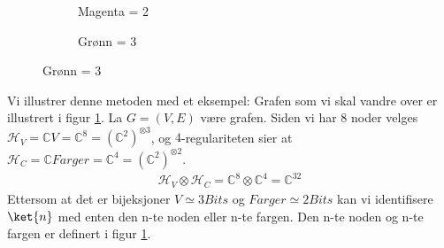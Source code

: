 \begin{figure}
\begin{center}
\begin{tcolorbox}
\begin{subfigure}{0.2451065\textwidth}
                        \caption{Magenta = 2}
                    \end{subfigure}
                    \begin{subfigure}{0.2451065\textwidth}
                        \caption{Grønn = 3}
                    \end{subfigure}
                \end{tcolorbox}
            \end{center}
            \label{fig:d-reg}
        \end{figure}

        Vi illustrer denne metoden med et eksempel: Grafen som vi skal vandre over er illustrert i figur \ref{fig:d-reg}. La $G=(V,E)$ være grafen. Siden vi har $8$ noder velges $\mathcal{H}_V=\mathbb{C}V=\mathbb{C}^8={(\mathbb{C}^{2})}^{\otimes 3}$, og $4$-regulariteten sier at $\mathcal{H}_C=\mathbb{C}Farger=\mathbb{C}^4={(\mathbb{C}^{2})}^{\otimes 2}$.
        \begin{align*}
            \mathcal{H}_V\otimes\mathcal{H}_C=\mathbb{C}^8\otimes\mathbb{C}^4=\mathbb{C}^{32}
        \end{align*}
        Ettersom at det er bijeksjoner $V\simeq 3Bits$ og $Farger\simeq 2Bits$ kan vi identifisere $\ket{n}$ med enten den n-te noden eller n-te fargen. Den n-te noden og n-te fargen er definert i figur \ref{fig:d-reg}.

